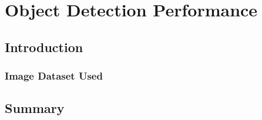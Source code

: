\chapter{Object Detection Performance}

\section{Introduction}


\subsection{Image Dataset Used}\label{ch:dataset}

\section{Summary}
